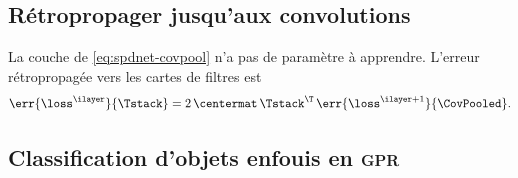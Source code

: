 
\subsection{Rétropropager jusqu'aux convolutions}
\label{sec:spdnet-covpool-backprop}

\begin{proposition}
\label{prop:spdnet-covpool-grad}
  La couche \CovPool{} de \cref{eq:spdnet-covpool} n'a pas de paramètre à
  apprendre. L'erreur rétropropagée vers les cartes de filtres est
  \begin{equation}
    \err{\loss^{\ilayer}}{\Tstack}
    =
    2\,\centermat\,\Tstack^\T\,\err{\loss^{\ilayer+1}}{\CovPooled}.
    \label{eq:spdnet-covpool-grad}
  \end{equation}
\end{proposition}


\subsection{Classification d'objets enfouis en \textsc{gpr}}
\label{sec:spdnet-covpool-resultats}

